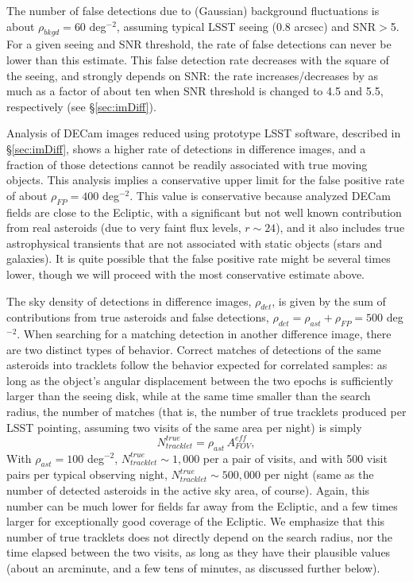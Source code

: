 The number of false detections due to (Gaussian) background fluctuations is
about $\rho_{bkgd} = 60$ deg$^{-2}$, assuming typical LSST seeing (0.8 arcsec)
and SNR$>$5. For a given seeing and SNR threshold, the rate of false detections can never be
lower than this estimate. This false detection rate decreases with the square of the seeing, and
strongly depends on SNR: the rate increases/decreases by as much as a factor of about ten
when SNR threshold is changed to 4.5 and 5.5, respectively (see \S\ref{sec:imDiff}).

Analysis of DECam images reduced using prototype LSST software, described in \S\ref{sec:imDiff},
shows a higher rate of detections in difference images, and a fraction of those detections
cannot be readily associated with true moving objects. This analysis implies a conservative
upper limit for the false positive rate of about $\rho_{FP} =  400$ deg$^{-2}$. This value
is conservative because analyzed DECam fields are close to the Ecliptic, with a significant but
not well known contribution from real asteroids (due to very faint flux levels, $r \sim 24$),
and it also includes true astrophysical transients that are not associated with static objects
(stars and galaxies). It is quite possible that the false positive rate might be several
times lower, though we will proceed with the most conservative estimate above.

The sky density of detections in difference images, $\rho_{det}$, is given by
the sum of contributions from true asteroids and false detections, $\rho_{det} = \rho_{ast} + \rho_{FP}
= 500$ deg$^{-2}$. When searching for a matching detection in another difference image, there are
two distinct types of behavior. Correct matches of detections of the same asteroids into tracklets follow the behavior
expected for correlated samples: as long as the object's angular displacement between the two epochs
is sufficiently larger than the seeing disk, while at the same time smaller than the search radius, the
number of matches (that is, the number of true tracklets produced per LSST pointing, assuming
two visits of the same area per night) is simply
\begin{equation}
                  N_{tracklet}^{true} = \rho_{ast}  \, A_{FOV}^{eff},
\end{equation}
With  $\rho_{ast} = 100$ deg$^{-2}$, $N_{tracklet}^{true} \sim 1,000$ per a pair of visits, and with
500 visit pairs per typical observing night, $N_{tracklet}^{true} \sim 500,000$ per night (same as
the number of detected asteroids in the active sky area, of course). Again,
this number can be much lower for fields far away from the Ecliptic, and a few times larger
for exceptionally good coverage of the Ecliptic. We emphasize that this number of true tracklets
does not directly depend on the search radius, nor the time elapsed between the two visits, as long
as they have their plausible values (about an arcminute, and a few tens of minutes, as discussed
further below).


